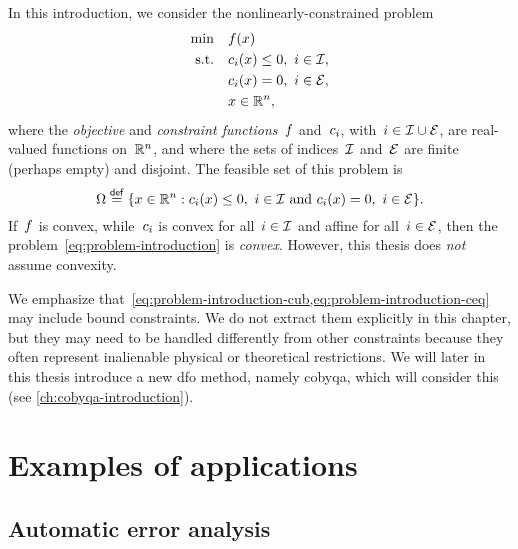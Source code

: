 In this introduction, we consider the nonlinearly-constrained problem
\begin{subequations}
    \label{eq:problem-introduction}
    \begin{align}
        \min        & \quad \obj(\iter)\\
        \text{s.t.} & \quad \con{i}(\iter) \le 0, ~ i \in \iub, \label{eq:problem-introduction-cub}\\
                    & \quad \con{i}(\iter) = 0, ~ i \in \ieq, \label{eq:problem-introduction-ceq}\\
                    & \quad \iter \in \R^n, \nonumber
    \end{align}
\end{subequations}
%
%
%
%
where the \emph{objective} and \emph{constraint functions}~$f$ and~$c_{i}$, with~$i \in \mathcal{I} \cup \mathcal{E}$, are real-valued functions on~$\mathbb{R}^n$, and where the sets of indices~$\mathcal{I}$ and~$\mathcal{E}$ are finite (perhaps empty) and disjoint.
The feasible set of this problem is
\begin{equation*}
    \fset \eqdef \set{\iter \in \R^n : \text{$\con{i}(\iter) \le 0, ~ i \in \iub$ and~$\con{i}(\iter) = 0, ~ i \in \ieq$}}.
\end{equation*}
If~$f$ is convex, while~$c_{i}$ is convex for all~$i \in \mathcal{I}$ and affine for all~$i \in \mathcal{E}$, then the problem~\cref{eq:problem-introduction} is \emph{convex}.
However, this thesis does \emph{not} assume convexity.

We emphasize that~\cref{eq:problem-introduction-cub,eq:problem-introduction-ceq} may include bound constraints.
We do not extract them explicitly in this chapter, but they may need to be handled differently from other constraints because they often represent inalienable physical or theoretical restrictions.
We will later in this thesis introduce a new \gls{dfo} method, namely \gls{cobyqa}, which will consider this (see \cref{ch:cobyqa-introduction}).

\section{Examples of applications}
\label{sec:dfo-examples}

\subsection{Automatic error analysis}

